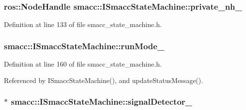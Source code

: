 \subsubsection[{\texorpdfstring{private\+\_\+nh\+\_\+}{private_nh_}}]{\setlength{\rightskip}{0pt plus 5cm}ros\+::\+Node\+Handle smacc\+::\+I\+Smacc\+State\+Machine\+::private\+\_\+nh\+\_\+\hspace{0.3cm}{\ttfamily [protected]}}\hypertarget{classsmacc_1_1ISmaccStateMachine_a9c6a5c647ecca6599589c12fdcd53bfc}{}\label{classsmacc_1_1ISmaccStateMachine_a9c6a5c647ecca6599589c12fdcd53bfc}


Definition at line 133 of file smacc\+\_\+state\+\_\+machine.\+h.

\subsubsection[{\texorpdfstring{run\+Mode\+\_\+}{runMode_}}]{ smacc\+::\+I\+Smacc\+State\+Machine\+::run\+Mode\+\_\+\hspace{0.3cm}{\ttfamily [private]}}\hypertarget{classsmacc_1_1ISmaccStateMachine_a9f8cfbf577f7ae7a48b7a328e2e6b589}{}\label{classsmacc_1_1ISmaccStateMachine_a9f8cfbf577f7ae7a48b7a328e2e6b589}


Definition at line 160 of file smacc\+\_\+state\+\_\+machine.\+h.



Referenced by I\+Smacc\+State\+Machine(), and update\+Status\+Message().

\subsubsection[{\texorpdfstring{signal\+Detector\+\_\+}{signalDetector_}}]{$\ast$ smacc\+::\+I\+Smacc\+State\+Machine\+::signal\+Detector\+\_\+\hspace{0.3cm}{\ttfamily [private]}}\hypertarget{classsmacc_1_1ISmaccStateMachine_a3982eb671f5f001cb047d3a467789986}{}\label{classsmacc_1_1ISmaccStateMachine_a3982eb671f5f001cb047d3a467789986}


